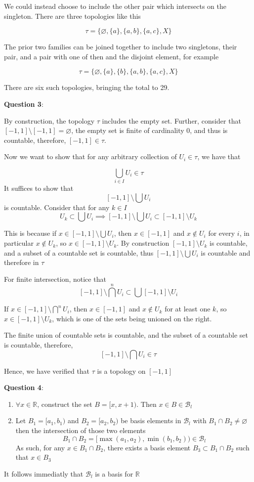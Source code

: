\documentclass{article} %
\newcommand{\question}[2][]{
  \begin{flushleft}
    \textbf{Question #1}: \textit{#2}

\end{flushleft}}
\begin{document}
We could instead choose to include the other pair which intersects on
the singleton. There are three topologies like this

\[
  \tau = \{\varnothing, \{a\}, \{a,b\}, \{a, c\}, X\}
\]

The prior two families can be joined together to include two
singletons, their pair, and a pair with one of then and the disjoint
element, for example

\[
  \tau = \{\varnothing, \{a\}, \{b\}, \{a,b\}, \{a,c\}, X\}
\]

There are six such topologies, bringing the total to 29.

\question[3]{}

By construction, the topology $\tau$ includes the empty set. Further,
consider that $[-1, 1] \setminus [-1,1] = \varnothing$, the empty
set is finite of cardinality $0$, and thus is countable, therefore,
$[-1,1] \in \tau$.

Now we want to show that for any arbitrary collection of $U_i \in
\tau$, we have that

\[
  \bigcup_{i\in I} U_i \in \tau
\]
It suffices to show that
\[
  [-1,1] \setminus \bigcup U_i
\]
is countable. Consider that for any $k \in I$
\[
  U_k \subset \bigcup U_i \implies [-1,1]\setminus \bigcup U_i
  \subset [-1,1] \setminus U_k
\]

This is because if $x \in [-1,1] \setminus \bigcup U_i$, then $x \in
[-1,1]$ and $x \notin U_i$ for every $i$, in particular $x \notin U_k$, so
$x \in [-1,1] \setminus U_k$. By construction $[-1,1]\setminus U_k$
is countable, and a subset of a
countable set is countable, thus $[-1,1] \setminus \bigcup U_i$ is
countable and therefore in $\tau$

For finite intersection, notice that
\[
  [-1,1] \setminus \bigcap^n U_i \subset \bigcup [-1,1]\setminus U_i
\]

If $x \in [-1,1] \setminus \bigcap^n U_i$, then $x \in [-1,1]$
and $x \notin U_k$ for at least one $k$, so $x \in [-1,1] \setminus
U_k$, which is one of the sets being unioned on the right.

The finite union of countable sets is countable, and the subset of a
countable set is countable, therefore,
\[
  [-1,1] \setminus \bigcap U_i \in \tau
\]

Hence, we have verified that $\tau$ is a topology on $[-1,1]$

\question[4]{}
\begin{enumerate}
  \item $\forall x \in \mathbb{R}$, construct the set $B = [x, x+1)$.
    Then $x \in B \in \mathcal{B}_l$
  \item Let $B_1 = [a_1, b_1)$ and $B_2 = [a_2,
    b_2)$ be basis elements in $\mathcal{B}_l$ with $B_1 \cap B_2
    \neq \varnothing$
    then the intersection of those two elements
    \[
      B_1 \cap B_2 = [\max(a_1, a_2), \min(b_1, b_2)) \in \mathcal{B}_l
    \]
    As such, for any $x \in B_1 \cap B_2$, there
    exists a basis element $B_3 \subset B_1 \cap B_2$ such that $x \in B_3$
\end{enumerate}
It follows immediatly that $\mathcal{B}_l$ is a basis for $\mathbb{R}$
\end{document}
